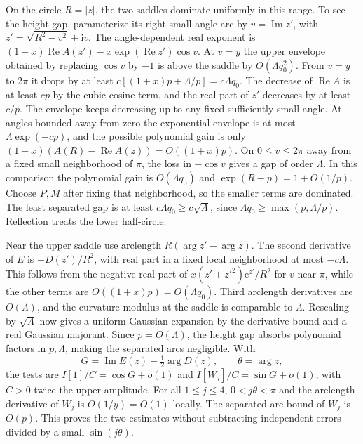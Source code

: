 \documentclass[11pt]{article}
\DeclareMathOperator{\Rea}{Re}
\DeclareMathOperator{\Ima}{Im}
\newcommand{\ee}{\mathrm e}
\newcommand{\ii}{\mathrm i}
\begin{document}
On the circle \(R=|z|\), the two saddles dominate uniformly in this range. To see the height gap, parameterize its right small-angle arc by \(v=\Ima z'\), with \(z'=\sqrt{R^2-v^2}+\ii v\). The angle-dependent real exponent is
\((1+x)\Rea A(z')-x\exp(\Rea z')\cos v\).
At \(v=y\) the upper envelope obtained by replacing \(\cos v\) by \(-1\) is above the saddle by \(O(\Lambda q_0^2)\). From \(v=y\) to \(2\pi\) it drops by at least \(c[(1+x)p+\Lambda/p]=c\Lambda q_0\). The decrease of \(\Rea A\) is at least \(c p\) by the cubic cosine term, and the real part of \(z'\) decreases by at least \(c/p\). The envelope keeps decreasing up to any fixed sufficiently small angle. At angles bounded away from zero the exponential envelope is at most \(\Lambda\exp(-cp)\), and the possible polynomial gain is only \((1+x)(A(R)-\Rea A(z))=O((1+x)p)\). On \(0\le v\le2\pi\) away from a fixed small neighborhood of \(\pi\), the loss in \(-\cos v\) gives a gap of order \(\Lambda\). In this comparison the polynomial gain is \(O(\Lambda q_0)\) and \(\exp(R-p)=1+O(1/p)\). Choose \(P,M\) after fixing that neighborhood, so the smaller terms are dominated. The least separated gap is at least \(c\Lambda q_0\ge c\sqrt\Lambda\), since \(\Lambda q_0\ge\max(p,\Lambda/p)\). Reflection treats the lower half-circle.

Near the upper saddle use arclength \(R(\arg z'-\arg z)\). The second derivative of \(E\) is \(-D(z')/R^2\), with real part in a fixed local neighborhood at most \(-c\Lambda\). This follows from the negative real part of \(x(z'+z'^2)\ee^{z'}/R^2\) for \(v\) near \(\pi\), while the other terms are \(O((1+x)p)=O(\Lambda q_0)\). Third arclength derivatives are \(O(\Lambda)\), and the curvature modulus at the saddle is comparable to \(\Lambda\). Rescaling by \(\sqrt\Lambda\) now gives a uniform Gaussian expansion by the derivative bound and a real Gaussian majorant. Since \(p=O(\Lambda)\), the height gap absorbs polynomial factors in \(p,\Lambda\), making the separated arcs negligible. With
\[
 G=\Ima E(z)-\tfrac12\arg D(z),\qquad \theta=\arg z ,
\]
the tests are \(I[1]/C=\cos G+o(1)\) and \(I[W_j]/C=\sin G+o(1)\), with \(C>0\) twice the upper amplitude. For all \(1\le j\le4\), \(0<j\theta<\pi\) and the arclength derivative of \(W_j\) is \(O(1/y)=O(1)\) locally. The separated-arc bound of \(W_j\) is \(O(p)\). This proves the two estimates without subtracting independent errors divided by a small \(\sin(j\theta)\).
\end{document}
